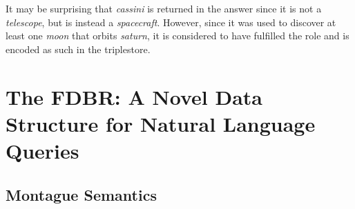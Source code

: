 \documentclass[../main.tex]{subfiles}
\begin{document}
\begin{refsection}
\examplespacing


\examplespacing

\noindent It may be surprising that \textit{cassini} is returned in the answer since it is not a \textit{telescope}, but is instead a \textit{spacecraft}.  However, since it was used to discover at least one \textit{moon} that orbits \textit{saturn}, it is considered to have fulfilled the  role and is encoded as such in the triplestore.

\section{The FDBR: A Novel Data Structure for Natural Language Queries}
\label{webist2019conf:album}

\subsection{Montague Semantics}


\end{refsection}
\end{document}
